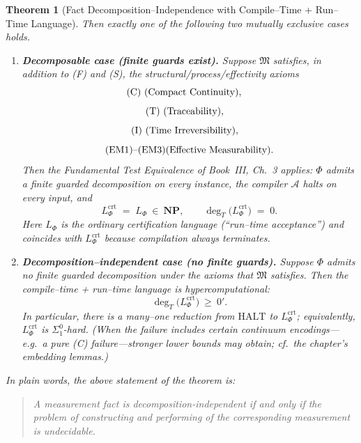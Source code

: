 \documentclass[12pt]{article}
\theoremstyle{definition}
\theoremstyle{plain}
\newtheorem{theorem}{Theorem}[section]
\begin{document}
\begin{theorem}[Fact Decomposition–Independence with Compile–Time + Run–Time Language]
\medskip
Then exactly one of the following two mutually exclusive cases holds.

\begin{enumerate}[label=(\alph*),leftmargin=2em,itemsep=6pt]
\item \textbf{Decomposable case (finite guards exist).}  
      Suppose \(\mathfrak M\) satisfies, in addition to \textup{(F)} and \textup{(S)}, the structural/process/effectivity axioms
      \[
        \textup{(C)}\ (\text{Compact Continuity}),\quad
      \]
      \[
        \textup{(T)}\ (\text{Traceability}),\quad
      \]
      \[
        \textup{(I)}\ (\text{Time Irreversibility}),\quad
      \]
      \[
        \textup{(EM1)}\text{–}\textup{(EM3)} (\text{Effective Measurability}).
      \]
      Then the Fundamental Test Equivalence of Book~III, Ch.~3 applies:
      \(\Phi\) admits a finite guarded decomposition on \emph{every} instance, the compiler \(\mathcal A\) halts on every input, and
      \[
        L^{\mathrm{crt}}_{\Phi} \;=\; L_{\Phi}\ \in\ \mathbf{NP},
        \qquad
        \deg_T\!\bigl(L^{\mathrm{crt}}_{\Phi}\bigr) \;=\; 0.
      \]
      Here \(L_{\Phi}\) is the ordinary certification language (“run–time acceptance”) and coincides with \(L^{\mathrm{crt}}_{\Phi}\) because compilation always terminates.

\item \textbf{Decomposition–independent case (no finite guards).}  
      Suppose \(\Phi\) admits \emph{no} finite guarded decomposition under the axioms that \(\mathfrak M\) satisfies.  
      Then the compile–time + run–time language is \emph{hypercomputational}:
      \[
        \deg_T\!\bigl(L^{\mathrm{crt}}_{\Phi}\bigr) \ \ge\ 0'.
      \]
      In particular, there is a many–one reduction from \(\mathrm{HALT}\) to \(L^{\mathrm{crt}}_{\Phi}\); equivalently,
      \(L^{\mathrm{crt}}_{\Phi}\) is \(\Sigma^0_1\)-hard.  (When the failure includes certain continuum encodings—e.g.\ a pure (C) failure—stronger lower bounds may obtain; cf.\ the chapter’s embedding lemmas.)
\end{enumerate}

In plain words, the above statement of the theorem is:
\begin{quote}
    A measurement fact is decomposition-independent if and only if the problem of constructing and performing of the corresponding measurement is undecidable.
\end{quote}


\end{theorem}
\end{document}
